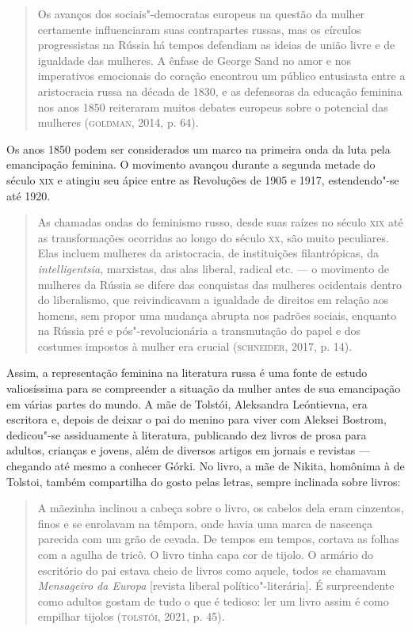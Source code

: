 \documentclass[11pt]{extarticle}
\begin{document}
\begin{quote}
Os avanços dos sociais"-democratas europeus na questão da mulher
certamente influenciaram suas contrapartes russas, mas os círculos
progressistas na Rússia há tempos defendiam as ideias de união livre e
de igualdade das mulheres. A ênfase de George Sand no amor e nos
imperativos emocionais do coração encontrou um público entusiasta entre
a aristocracia russa na década de 1830, e as defensoras da educação
feminina nos anos 1850 reiteraram muitos debates europeus sobre o
potencial das mulheres (\textsc{goldman}, 2014, p. 64).
\end{quote}

Os anos 1850 podem ser considerados um marco na primeira onda da luta
pela emancipação feminina. O movimento avançou durante a segunda metade
do século \textsc{xix} e atingiu seu ápice entre as Revoluções de 1905 e 1917,
estendendo"-se até 1920.

\begin{quote}
As chamadas ondas do feminismo russo, desde suas raízes no século \textsc{xix}
até as transformações ocorridas ao longo do século \textsc{xx}, são muito
peculiares. Elas incluem mulheres da aristocracia, de instituições
filantrópicas, da \emph{intelligentsia}, marxistas, das alas liberal,
radical etc. --- o movimento de mulheres da Rússia se difere das
conquistas das mulheres ocidentais dentro do liberalismo, que
reivindicavam a igualdade de direitos em relação aos homens, sem propor
uma mudança abrupta nos padrões sociais, enquanto na Rússia pré e
pós"-revolucionária a transmutação do papel e dos costumes impostos à
mulher era crucial (\textsc{schneider}, 2017, p. 14).
\end{quote}

Assim, a representação feminina na literatura russa é uma fonte de
estudo valiosíssima para se compreender a situação da mulher antes de
sua emancipação em várias partes do mundo. A mãe de Tolstói, Aleksandra
Leóntievna, era escritora e, depois de deixar o pai do menino para viver
com Aleksei Bostrom, dedicou"-se assiduamente à literatura, publicando
dez livros de prosa para adultos, crianças e jovens, além de diversos
artigos em jornais e revistas --- chegando até mesmo a conhecer Górki.
No livro, a mãe de Nikita, homônima à de Tolstoi, também compartilha do
gosto pelas letras, sempre inclinada sobre livros:

\begin{quote}
A mãezinha inclinou a cabeça sobre o livro, os cabelos dela eram
cinzentos, finos e se enrolavam na têmpora, onde havia uma marca de
nascença parecida com um grão de cevada. De tempos em tempos, cortava as
folhas com a agulha de tricô. O livro tinha capa cor de tijolo. O
armário do escritório do pai estava cheio de livros como aquele, todos
se chamavam \emph{Mensageiro da Europa} {[}revista liberal
político"-literária{]}. É surpreendente como adultos gostam de tudo o que
é tedioso: ler um livro assim é como empilhar tijolos (\textsc{tolstói}, 2021,
p. 45).
\end{quote}
\end{document}
